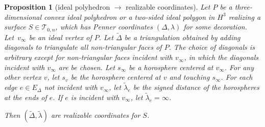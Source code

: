 \documentclass[a4paper, 11pt]{article}
\newcommand{\Teich}{\mathcal{T}}
\newcommand{\Deltil}{\widetilde{\Delta}}
\newcommand{\lamtil}{\tilde{\lambda}}
\theoremstyle{plain}
\newtheorem{proposition}[theorem]{Proposition}
\theoremstyle{definition}
\begin{document}
\begin{proposition}[ideal polyhedron $\rightarrow$ realizable coordinates]
  \label{prop:poly2realizable}
  Let $P$ be a three-dimensional convex ideal polyhedron or a
  two-sided ideal polygon in $H^{3}$ realizing a surface
  $S\in\Teich_{0,n}$, which has Penner coordinates $(\Delta,\lambda)$
  for some decoration.  Let~$v_{\infty}$ be an ideal vertex of
  $P$. Let $\Deltil$ be a triangulation obtained by adding diagonals
  to triangulate all non-triangular faces of $P$. The choice of
  diagonals is arbitrary except for non-triangular faces incident with
  $v_{\infty}$, in which the diagonals incident with $v_{\infty}$ are
  be chosen. Let $s_{\infty}$ be a horosphere centered at
  $v_{\infty}$. For any other vertex $v$, let $s_{v}$ be the
  horosphere centered at $v$ and touching $s_{\infty}$. For each edge
  $e\in E_{\Delta}$ not incident with $v_{\infty}$, let $\lamtil_{e}$
  be the signed distance of the horospheres at the ends of $e$. If $e$
  is incident with $v_{\infty}$, let $\lamtil_{e}=\infty$.

  Then $(\Deltil,\lamtil)$ are realizable coordinates for $S$.
\end{proposition}
\end{document}

